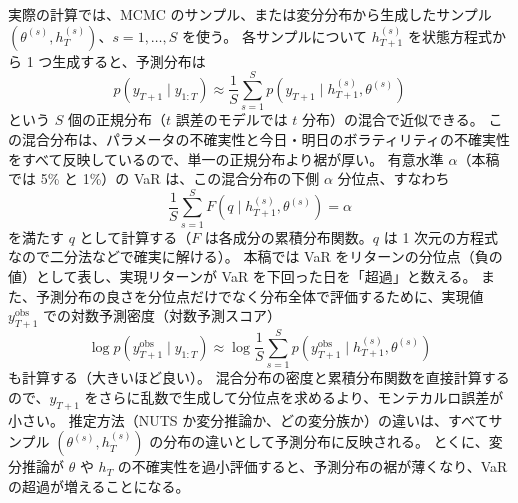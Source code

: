 実際の計算では、MCMC のサンプル、または変分分布から生成したサンプル $(\theta^{(s)}, h_T^{(s)})$、$s = 1, \dots, S$ を使う。
各サンプルについて $h_{T+1}^{(s)}$ を状態方程式から 1 つ生成すると、予測分布は
\[
  p(y_{T+1} \mid y_{1:T}) \approx \frac{1}{S} \sum_{s=1}^{S} p\!\left(y_{T+1} \mid h_{T+1}^{(s)}, \theta^{(s)}\right)
\]
という $S$ 個の正規分布（$t$ 誤差のモデルでは $t$ 分布）の混合で近似できる。
この混合分布は、パラメータの不確実性と今日・明日のボラティリティの不確実性をすべて反映しているので、単一の正規分布より裾が厚い。
有意水準 $\alpha$（本稿では 5\% と 1\%）の VaR は、この混合分布の下側 $\alpha$ 分位点、すなわち
\[
  \frac{1}{S} \sum_{s=1}^{S} F\!\left(q \mid h_{T+1}^{(s)}, \theta^{(s)}\right) = \alpha
\]
を満たす $q$ として計算する（$F$ は各成分の累積分布関数。$q$ は 1 次元の方程式なので二分法などで確実に解ける）。
本稿では VaR をリターンの分位点（負の値）として表し、実現リターンが VaR を下回った日を「超過」と数える。
また、予測分布の良さを分位点だけでなく分布全体で評価するために、実現値 $y_{T+1}^{\mathrm{obs}}$ での対数予測密度（対数予測スコア）
\[
  \log p(y_{T+1}^{\mathrm{obs}} \mid y_{1:T}) \approx \log \frac{1}{S} \sum_{s=1}^{S} p\!\left(y_{T+1}^{\mathrm{obs}} \mid h_{T+1}^{(s)}, \theta^{(s)}\right)
\]
も計算する（大きいほど良い）。
混合分布の密度と累積分布関数を直接計算するので、$y_{T+1}$ をさらに乱数で生成して分位点を求めるより、モンテカルロ誤差が小さい。
推定方法（NUTS か変分推論か、どの変分族か）の違いは、すべてサンプル $(\theta^{(s)}, h_T^{(s)})$ の分布の違いとして予測分布に反映される。
とくに、変分推論が $\theta$ や $h_T$ の不確実性を過小評価すると、予測分布の裾が薄くなり、VaR の超過が増えることになる。
